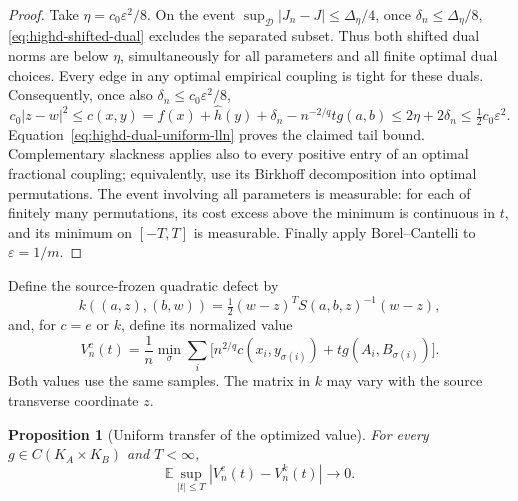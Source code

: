\documentclass[11pt,reqno]{amsart}
\newtheorem{proposition}[theorem]{Proposition}
\theoremstyle{definition}
\theoremstyle{remark}
\numberwithin{equation}{section}
\newcommand{\E}{\mathbb E}
\begin{document}
\begin{proof}
Take \(\eta=c_0\varepsilon^2/8\). On the event
\(\sup_{\mathcal D}|J_n-J|\le\Delta_\eta/4\), once
\(\delta_n\le\Delta_\eta/8\),
\eqref{eq:highd-shifted-dual} excludes the separated subset.
Thus both shifted dual norms are below \(\eta\), simultaneously
for all parameters and all finite optimal dual choices. Every edge
in any optimal empirical coupling is tight for these duals.
Consequently, once also \(\delta_n\le c_0\varepsilon^2/8\),
\[
c_0|z-w|^2\le c(x,y)
 =f(x)+\widehat h(y)+\delta_n-n^{-2/q}t g(a,b)
 \le2\eta+2\delta_n\le\tfrac12c_0\varepsilon^2.
\]
Equation~\eqref{eq:highd-dual-uniform-lln} proves the claimed
tail bound. Complementary slackness applies also to every positive
entry of an optimal fractional coupling; equivalently, use its
Birkhoff decomposition into optimal permutations. The event
involving all parameters is measurable: for each of finitely many
permutations, its cost excess above the minimum is continuous in
\(t\), and its minimum on \([-T,T]\) is measurable.
Finally apply Borel--Cantelli to \(\varepsilon=1/m\).
\end{proof}

Define the source-frozen quadratic defect by
\[
k((a,z),(b,w))
 =\tfrac12(w-z)^TS(a,b,z)^{-1}(w-z),
\]
and, for \(c=e\) or \(k\), define its normalized value
\[
V_n^c(t)=\frac1n\min_\sigma\sum_i
 \bigl[n^{2/q}c(x_i,y_{\sigma(i)})
       +t g(A_i,B_{\sigma(i)})\bigr].
\]
Both values use the same samples. The matrix in \(k\) may vary
with the source transverse coordinate \(z\).

\begin{proposition}[Uniform transfer of the optimized value]
\label{prop:highd-quadratic-transfer}
For every \(g\in C(K_A\times K_B)\) and \(T<\infty\),
\[
\E\sup_{|t|\le T}|V_n^e(t)-V_n^k(t)|\longrightarrow0.
\]
\end{proposition}
\end{document}
